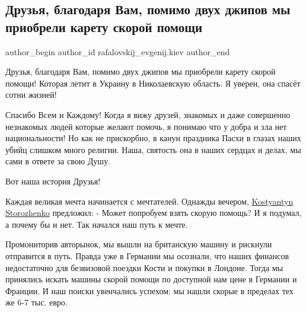  
 
 
 
 
 
\subsection{Друзья, благодаря Вам, помимо двух джипов мы приобрели карету скорой помощи}
\label{sec:21_04_2022.fb.rafalovskij_evgenij.kiev.1.kareta_skoroj_pomoschi}
 
\ifcmt
 author_begin
   author_id rafalovskij_evgenij.kiev
 author_end
\fi

Друзья, благодаря Вам, помимо двух джипов мы приобрели карету скорой помощи!
Которая летит в Украину в Николаевскую область. Я уверен, она спасёт сотни
жизней!

Спасибо Всем и Каждому! Когда я вижу друзей, знакомых и даже совершенно
незнакомых людей которые желают помочь, я понимаю что  у добра и зла нет
национальности! Но как не прискорбно, в канун праздника Пасхи в глазах наших
убийц слишком много религии. Наша, святость она в наших сердцах и делах, мы
сами в ответе за свою Душу.

Вот наша история Друзья! 

Каждая великая мечта начинается с мечтателей. Однажды вечером,
\href{https://www.facebook.com/kostyantyn.storozhenko}{Kostyantyn Storozhenko}
предложил: - Может попробуем взять скорую помощь? И я подумал, а почему бы и
нет. Так начался наш путь к мечте.


Промониторив авторынок, мы вышли на британскую машину и рискнули отправится  в
путь. Правда уже в Германии мы осознали, что наших финансов недостаточно для
безвизовой поездки Кости и покупки в Лондоне. Тогда мы принялись искать  машины
скорой помощи по доступной нам цене в Германии и Франции. И наш поиски
увенчались успехом: мы нашли скорые в пределах тех же 6-7 тыс. евро. 


